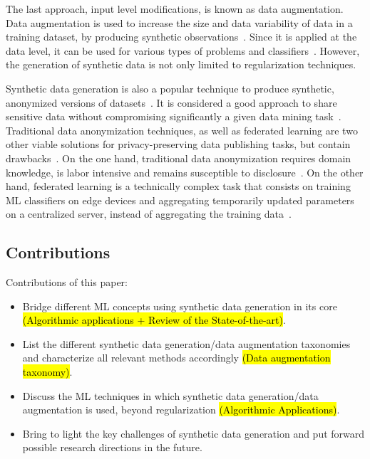 \documentclass[parskip=full]{scrartcl}
\begin{document}
The last approach, input level modifications, is known as data augmentation.
Data augmentation is used to increase the size and data variability of data in
a training dataset, by producing synthetic observations~\cite{Van2001,
Wong2016}. Since it is applied at the data level, it can be used for various
types of problems and classifiers~\cite{Behpour2019}. However, the generation
of synthetic data is not only limited to regularization techniques.




Synthetic data generation is also a popular technique to produce synthetic,
anonymized versions of datasets~\cite{dankar2021fake}. It is considered a good
approach to share sensitive data without compromising significantly a given
data mining task~\cite{taub2018differential, park2018data}.  Traditional data
anonymization techniques, as well as federated learning are two other viable
solutions for privacy-preserving data publishing tasks, but contain
drawbacks~\cite{hernandez2022synthetic}. On the one hand, traditional data
anonymization requires domain knowledge, is labor intensive and remains
susceptible to disclosure~\cite{reiter2004new}. On the other hand, federated
learning is a technically complex task that consists on training ML
classifiers on edge devices and aggregating temporarily updated parameters on
a centralized server, instead of aggregating the training data~\cite{yu2022survey}.


\subsection{Contributions}

Contributions of this paper:

\begin{itemize}
    \item Bridge different ML concepts using synthetic data generation in its
        core \hl{(Algorithmic applications + Review of the State-of-the-art)}.
    \item List the different synthetic data generation/data augmentation
        taxonomies and characterize all relevant methods accordingly \hl{(Data
        augmentation taxonomy)}.
    \item Discuss the ML techniques in which synthetic data generation/data augmentation is used,
        beyond regularization \hl{(Algorithmic Applications)}.
    \item Bring to light the key challenges of synthetic data generation and
        put forward possible research directions in the future.
\end{itemize}
\end{document}
